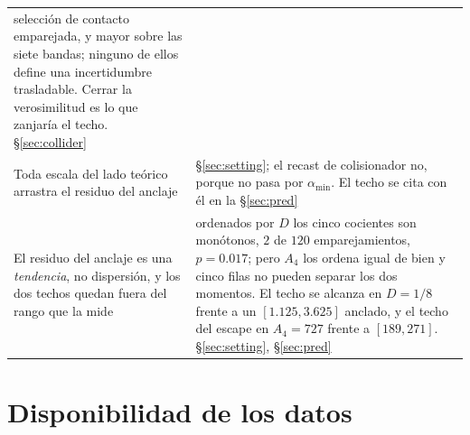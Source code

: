 \documentclass[11pt,a4paper]{article}
\newcommand{\amin}{\alpha_{\min}}
\begin{document}
\begin{longtable}{p{}p{}}
selección de contacto emparejada, y mayor sobre las siete bandas; ninguno de ellos define una
incertidumbre trasladable. Cerrar la
verosimilitud es lo que zanjaría el techo. \S\ref{sec:collider}\\
Toda escala del lado teórico arrastra el residuo del anclaje & \S\ref{sec:setting}; el recast de
colisionador no, porque no pasa por $\amin$. El techo se cita con él en la \S\ref{sec:pred}\\
El residuo del anclaje es una \emph{tendencia}, no dispersión, y los dos techos quedan fuera del
rango que la mide & ordenados por $D$ los cinco cocientes son monótonos, $2$ de $120$
emparejamientos, $p=0.017$; pero $A_4$ los ordena igual de bien y cinco filas no pueden separar los
dos momentos. El techo se alcanza en $D=1/8$ frente a un $[1.125,3.625]$ anclado, y el techo del
escape en $A_4=727$ frente a $[189,271]$. \S\ref{sec:setting}, \S\ref{sec:pred}\\
\bottomrule
\end{longtable}
\endgroup

\section*{Disponibilidad de los datos}
\end{document}
